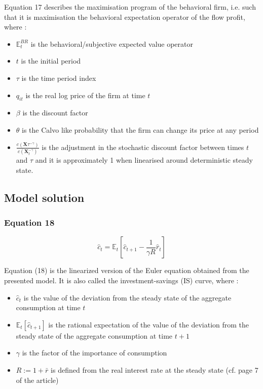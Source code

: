 \documentclass{article}
\begin{document}
Equation 17 describes the maximisation program of the behavioral firm, i.e. such that it is maximisation the behavioral expectation operator of the flow profit, where : 
\begin{itemize}
    \item $\mathbb{E}_{t}^{BR}$ is the behavioral/subjective expected value operator 
    \item $t$ is the initial period 
    \item $\tau$ is the time period index  
    \item $q_{it}$ is the real log price of the firm at time $t$
    \item $\beta$ is the discount factor
    \item $\theta$ is the Calvo like probability that the firm can change its price at any period
    \item $\frac{c\left(\bm{X}{\tau}^{-\gamma}\right)}{c\left(\bm{X}_{t}^{-\gamma}\right)}$ is the adjustment in the stochastic discount factor between times $t$ and $\tau$ and it is approximately 1 when linearised around deterministic steady state. 
\end{itemize}

\subsection{Model solution}

\subsubsection*{Equation 18}
\begin{equation}
    \hat{c}_{t}=\mathbb{E}_{t}\left[\hat{c}_{t+1}-\frac{1}{\gamma R}\hat{r}_{t}\right]
\end{equation}

Equation (18) is the linearized version of the Euler equation obtained from the presented model. It is also called the investment-savings (IS) curve, where : 
\begin{itemize}
    \item $\hat{c}_{t}$ is the value of the deviation from the steady state of the aggregate consumption at time $t$
    \item $\mathbb{E}_{t}\left[\hat{c}_{t+1}\right]$ is the rational expectation of the value of the deviation from the steady state of the aggregate consumption at time $t+1$
    \item $\gamma$ is the factor of the importance of consumption
    \item $R:=1+\bar{r}$ is defined from the real interest rate at the steady state (cf. page 7 of the article)
\end{itemize}
\end{document}
